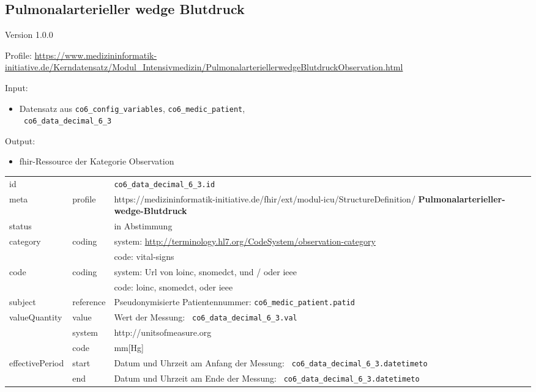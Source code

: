 \subsection{
Pulmonalarterieller wedge Blutdruck} 
\noindent Version 1.0.0

\noindent Profile: \url{https://www.medizininformatik-initiative.de/Kerndatensatz/Modul_Intensivmedizin/PulmonalarteriellerwedgeBlutdruckObservation.html}

\noindent Input:
\begin{itemize}
	\item Datensatz aus \texttt{co6\_config\_variables}, \texttt{co6\_medic\_patient}, \\ \texttt{
co6\_data\_decimal\_6\_3}
\end{itemize}
Output:
\begin{itemize}
        \item \ac{fhir}-Ressource der Kategorie \glqq Observation\grqq{}
\end{itemize}
\begin{longtable}{|l|l|p{7.5cm}|}
        \hline
        \rowcolor{lightgray} \multicolumn{3}{|l|}{Data Mapping (inhaltlich)} \\ \hline
        id &  & \texttt{co6\_data\_decimal\_6\_3.id} \\ \hline
	meta & profile & https://medizininformatik-initiative.de/fhir/ext/modul-icu/StructureDefinition/\textbf{
Pulmonalarterieller-wedge-Blutdruck} \\ \hline 
	status &  & in Abstimmung  \\ \hline 
	category & coding & system: \url{http://terminology.hl7.org/CodeSystem/observation-category} \\
\cline{3-3}
	& & code: vital-signs\\ \hline
	code & coding & system: Url von \ac{loinc}, \ac{snomedct}, und / oder \ac{ieee} \\ 
	\cline{3-3} 
	 &  & code: \ac{loinc}, \ac{snomedct}, oder \ac{ieee} \\ \hline
	subject & reference & Pseudonymisierte Patientennummer: \texttt{co6\_medic\_patient.patid} \\ \hline
	valueQuantity & value & Wert der Messung: \texttt{
co6\_data\_decimal\_6\_3.val} \\
        \cline{2-3}
         & system & http://unitsofmeasure.org \\
         \cline{2-3}
         & code & mm[Hg] \\ \hline
    effectivePeriod & start & Datum und Uhrzeit am Anfang der Messung: \texttt{
co6\_data\_decimal\_6\_3.datetimeto} \\
    \cline{2-3}
     & end & Datum und Uhrzeit am Ende der Messung: \texttt{
co6\_data\_decimal\_6\_3.datetimeto} \\ \hline
\end{longtable}


